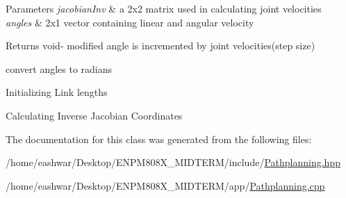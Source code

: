 \begin{DoxyParams}{Parameters}
{\em jacobian\+Inv} & a 2x2 matrix used in calculating joint velocities\\
\hline
{\em angles} & 2x1 vector containing linear and angular velocity\\
\hline
\end{DoxyParams}
\begin{DoxyReturn}{Returns}
void-\/ modified angle is incremented by joint velocities(step size) 
\end{DoxyReturn}
convert angles to radians

Initializing Link lengths

Calculating Inverse Jacobian Coordinates 

The documentation for this class was generated from the following files\+:\begin{DoxyCompactItemize}
\item 
/home/eashwar/\+Desktop/\+E\+N\+P\+M808\+X\+\_\+\+M\+I\+D\+T\+E\+R\+M/include/\hyperlink{Pathplanning_8hpp}{Pathplanning.\+hpp}\item 
/home/eashwar/\+Desktop/\+E\+N\+P\+M808\+X\+\_\+\+M\+I\+D\+T\+E\+R\+M/app/\hyperlink{Pathplanning_8cpp}{Pathplanning.\+cpp}\end{DoxyCompactItemize}
